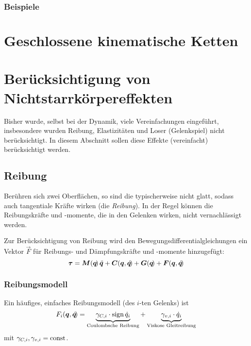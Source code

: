 			\subsubsection{Beispiele} %

	\section{Geschlossene kinematische Ketten} %

	\section{Berücksichtigung von Nichtstarrkörpereffekten}
		Bisher wurde, selbst bei der Dynamik, viele Vereinfachungen eingeführt, insbesondere wurden Reibung, Elastizitäten und Loser (Gelenkspiel) nicht berücksichtigt. In diesem Abschnitt sollen diese Effekte (vereinfacht) berücksichtigt werden.

		\subsection{Reibung}
			Berühren sich zwei Oberflächen, so sind die typischerweise nicht glatt, sodass auch tangentiale Kräfte wirken (die \emph{Reibung}). In der Regel können die Reibungskräfte und -momente, die in den Gelenken wirken, nicht vernachlässigt werden.

			Zur Berücksichtigung von Reibung wird den Bewegungsdifferentialgleichungen \INVDYN ein Vektor \( \vec{F} \) für Reibungs- und Dämpfungskräfte und -momente hinzugefügt:
			\begin{equation*}
				\bm{\tau} = \bm{M}(\bm{q}\!)\, \ddot{\bm{q}} + \bm{C}(\bm{q}, \dot{\bm{q}}\!) + \bm{G}(\bm{q}\!) + \bm{F}(\bm{q}, \dot{\bm{q}}\!)
			\end{equation*}

			\subsubsection{Reibungsmodell}
				Ein häufiges, einfaches Reibungsmodell (des \(i\)-ten Gelenks) ist
				\begin{equation*}
					F_i(\bm{q}, \dot{\bm{q}}\!) = \underbrace{\gamma_{C, i} \cdot \operatorname{sign} \dot{q}_i}_\text{Coulombsche Reibung} + \underbrace{\gamma_{v, i} \cdot \dot{q}_i}_\text{Viskose Gleitreibung}
				\end{equation*}
				mit \( \gamma_{C, i}, \gamma_{v, i} = \operatorname{const} \).


